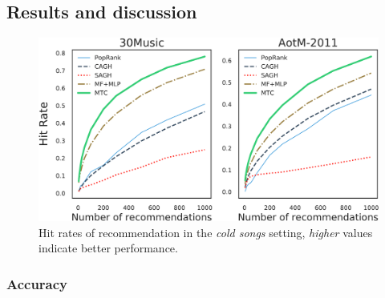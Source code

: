 \subsection{Results and discussion}

\begin{figure}[!t]
    \centering
    \includegraphics[width=\columnwidth]{fig/hr1.pdf}
    \caption{Hit rates of recommendation in the \emph{cold songs} setting,
\emph{higher} values indicate better performance.}
    \label{fig:hr1}
\end{figure}



\subsubsection{Accuracy}

